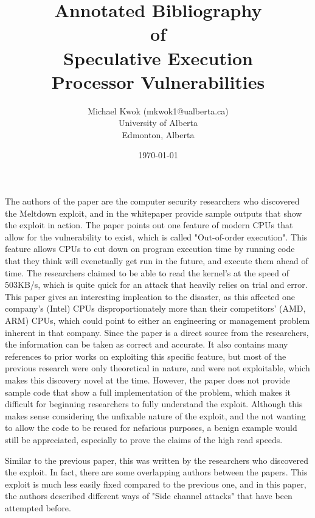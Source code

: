 \documentclass[11pt]{article}
\title{Annotated Bibliography \\ of \\ Speculative Execution \\ Processor Vulnerabilities}
\author{Michael Kwok (mkwok1@ualberta.ca) \\ University of Alberta \\ Edmonton, Alberta}
\date{\today}
\begin{document}
\pagestyle{headings}
\maketitle

\cite{Meltdown} 

The authors of the paper are the computer security researchers who discovered
the Meltdown exploit, and in the whitepaper provide sample outputs that show
the exploit in action. The paper points out one feature of modern CPUs that allow
for the vulnerability to exist, which is called "Out-of-order execution". This
feature allows CPUs to cut down on program execution time by running code that
they think will evenetually get run in the future, and execute them ahead of
time. The researchers claimed to
be able to read the kernel's at the speed of 503KB/s, which is quite quick for an
attack that heavily relies on trial and error. This paper gives an interesting
implcation to the disaster, as this affected one company's (Intel) CPUs
disproportionately more than their competitors' (AMD, ARM) CPUs, which could
point to either an engineering or management problem inherent in that company.
Since the paper is a direct source from the researchers, the information can be
taken as correct and accurate. It also contains many references to prior works
on exploiting this specific feature, but most of the previous research were only
theoretical in nature, and were not exploitable, which makes this discovery
novel at the time. However, the paper does not provide sample code that show a
full implementation of the problem, which makes it difficult for beginning
researchers to fully understand the exploit. Although this makes sense considering
the unfixable nature of the exploit, and the not wanting to allow the code to be
reused for nefarious purposes, a benign example would still be appreciated, especially
to prove the claims of the high read speeds.

\hfill

\cite{Spectre} 

Similar to the previous paper, this was written by the researchers who
discovered the exploit. In fact, there are some overlapping authors between the
papers. This exploit is much less easily fixed compared to the previous one, and
in this paper, the authors described different ways of "Side channel attacks"
that have been attempted before. 

\end{document}
